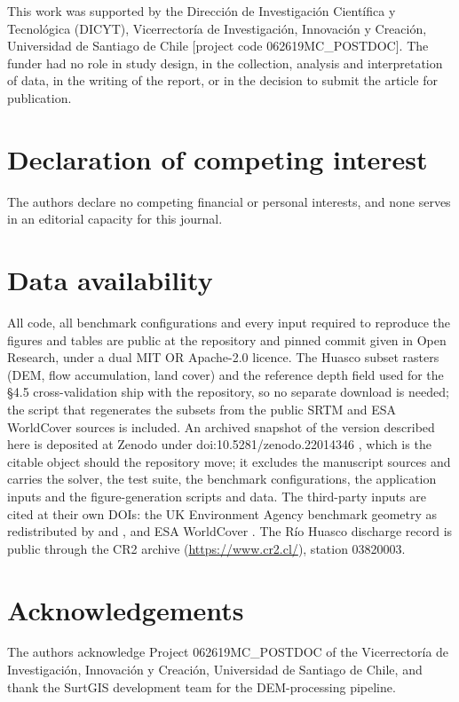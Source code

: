 \documentclass[preprint,review,12pt,authoryear]{elsarticle}
\begin{document}
This work was supported by the Dirección de Investigación Científica y
Tecnológica (DICYT), Vicerrectoría de Investigación, Innovación y
Creación, Universidad de Santiago de Chile [project code
062619MC\_POSTDOC]. The funder had no role in study design, in the
collection, analysis and interpretation of data, in the writing of the
report, or in the decision to submit the article for publication.

\section*{Declaration of competing interest}

The authors declare no competing financial or personal interests, and none serves in an editorial capacity for this journal.

\section*{Data availability}

All code, all benchmark configurations and every input required to
reproduce the figures and tables are public at the repository and
pinned commit given in Open Research, under a dual MIT OR Apache-2.0
licence. The Huasco subset rasters (DEM, flow accumulation, land cover)
and the reference depth field used for the \S4.5 cross-validation ship
with the repository, so no separate download is needed; the script that
regenerates the subsets from the public SRTM and ESA WorldCover sources
is included. An archived snapshot of the version described here is
deposited at Zenodo under doi:10.5281/zenodo.22014346
\citep{HydrofluxArchive}, which is the citable object should the repository
move; it excludes the manuscript sources and carries the solver, the
test suite, the benchmark configurations, the application inputs and
the figure-generation scripts and data. The third-party inputs are
cited at their own DOIs: the UK Environment Agency benchmark geometry
as redistributed by \citep{Shaw2021} and \citep{Sharifian2023}, and ESA
WorldCover \citep{ESAWorldCover2021}. The Río Huasco discharge record is
public through the CR2 archive (\url{https://www.cr2.cl/}), station
03820003.

\section*{Acknowledgements}

The authors acknowledge Project 062619MC\_POSTDOC of the Vicerrectoría
de Investigación, Innovación y Creación, Universidad de Santiago de
Chile, and thank the SurtGIS development team for the DEM-processing
pipeline.
\end{document}
